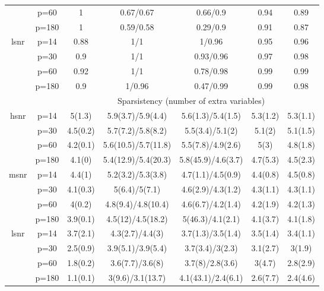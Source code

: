 \begin{table}[ht]
{\begin{tabular}{|c|c|ccccc|}
   & p=60 & 1 & 0.67/0.67 & 0.66/0.9 & 0.94 & 0.89 \\ 
   & p=180 & 1 & 0.59/0.58 & 0.29/0.9 & 0.91 & 0.87 \\ 
  \midrule\multirow{4}[2]{*}{lsnr} & p=14 & 0.88 & 1/1 & 1/0.96 & 0.95 & 0.96 \\ 
   & p=30 & 0.9 & 1/1 & 0.93/0.96 & 0.97 & 0.98 \\ 
   & p=60 & 0.92 & 1/1 & 0.78/0.98 & 0.99 & 0.99 \\ 
   & p=180 & 0.9 & 1/0.96 & 0.47/0.99 & 0.99 & 0.98 \\ 
   \midrule 
 \multicolumn{1}{|c}{} &       & \multicolumn{5}{c|}{Sparsistency (number of extra variables)} \\
\midrule\multirow{4}[2]{*}{hsnr} & p=14 & 5(1.3) & 5.9(3.7)/5.9(4.4) & 5.6(1.3)/5.4(1.5) & 5.3(1.2) & 5.3(1.1) \\ 
   & p=30 & 4.5(0.2) & 5.7(7.2)/5.8(8.2) & 5.5(3.4)/5.1(2) & 5.1(2) & 5.1(1.5) \\ 
   & p=60 & 4.2(0.1) & 5.6(10.5)/5.7(11.8) & 5.5(7.8)/4.9(2.6) & 5(3) & 4.8(1.8) \\ 
   & p=180 & 4.1(0) & 5.4(12.9)/5.4(20.3) & 5.8(45.9)/4.6(3.7) & 4.7(5.3) & 4.5(2.3) \\ 
  \midrule\multirow{4}[2]{*}{msnr} & p=14 & 4.4(1) & 5.2(3.2)/5.3(3.8) & 4.7(1.1)/4.5(0.9) & 4.4(0.8) & 4.5(0.8) \\ 
   & p=30 & 4.1(0.3) & 5(6.4)/5(7.1) & 4.6(2.9)/4.3(1.2) & 4.3(1.1) & 4.3(1.1) \\ 
   & p=60 & 4(0.2) & 4.8(9.4)/4.8(10.4) & 4.6(6.7)/4.2(1.4) & 4.2(1.9) & 4.2(1.3) \\ 
   & p=180 & 3.9(0.1) & 4.5(12)/4.5(18.2) & 5(46.3)/4.1(2.1) & 4.1(3.7) & 4.1(1.8) \\ 
  \midrule\multirow{4}[2]{*}{lsnr} & p=14 & 3.7(2.1) & 4.3(2.7)/4.4(3) & 3.7(1.3)/3.5(1.4) & 3.5(1.4) & 3.4(1.1) \\ 
   & p=30 & 2.5(0.9) & 3.9(5.1)/3.9(5.4) & 3.7(3.4)/3(2.3) & 3.1(2.7) & 3(1.9) \\ 
   & p=60 & 1.8(0.2) & 3.6(7.7)/3.6(8) & 3.7(8)/2.8(3.6) & 3(4.7) & 2.8(2.9) \\ 
   & p=180 & 1.1(0.1) & 3(9.6)/3.1(13.7) & 4.1(43.1)/2.4(6.1) & 2.6(7.7) & 2.4(4.6) \\ 
   \bottomrule 
\end{tabular}
}
\end{table}
